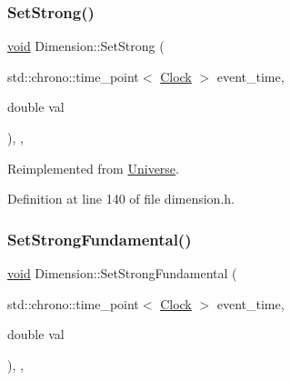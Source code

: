 \mbox{\label{class_dimension_ab9021cb6727ed590026bf870c638576d}} 
\subsubsection{\texorpdfstring{Set\+Strong()}{SetStrong()}}
{\footnotesize\ttfamily \mbox{\hyperlink{glad_8h_a950fc91edb4504f62f1c577bf4727c29}{void}} Dimension\+::\+Set\+Strong (\begin{DoxyParamCaption}\item[{std\+::chrono\+::time\+\_\+point$<$ \mbox{\hyperlink{universe_8h_a0ef8d951d1ca5ab3cfaf7ab4c7a6fd80}{Clock}} $>$}]{event\+\_\+time,  }\item[{double}]{val }\end{DoxyParamCaption})\hspace{0.3cm}{\ttfamily [inline]}, {\ttfamily [final]}, {\ttfamily [virtual]}}



Reimplemented from \mbox{\hyperlink{class_universe_a5946c8f3d4cda305f3ecd10df21a2f94}{Universe}}.



Definition at line 140 of file dimension.\+h.

\mbox{\label{class_dimension_a2de864aaa4b1074684395dbe928468c1}} 
\subsubsection{\texorpdfstring{Set\+Strong\+Fundamental()}{SetStrongFundamental()}}
{\footnotesize\ttfamily \mbox{\hyperlink{glad_8h_a950fc91edb4504f62f1c577bf4727c29}{void}} Dimension\+::\+Set\+Strong\+Fundamental (\begin{DoxyParamCaption}\item[{std\+::chrono\+::time\+\_\+point$<$ \mbox{\hyperlink{universe_8h_a0ef8d951d1ca5ab3cfaf7ab4c7a6fd80}{Clock}} $>$}]{event\+\_\+time,  }\item[{double}]{val }\end{DoxyParamCaption})\hspace{0.3cm}{\ttfamily [inline]}, {\ttfamily [final]}, {\ttfamily [virtual]}}



